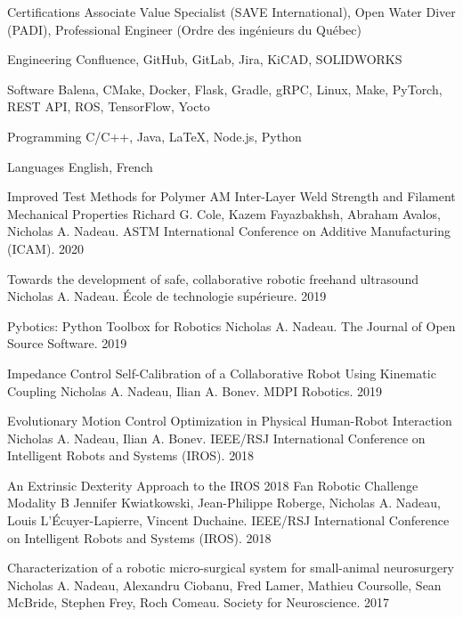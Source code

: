 \documentclass[11pt, letterpaper]{awesome-cv}
\begin{document}
\newpage

\begin{cvskills}

    \cvskill
    {Certifications}
    {
        Associate Value Specialist (SAVE International),
        Open Water Diver (PADI),
        Professional Engineer (Ordre des ingénieurs du Québec)
    }

    \cvskill
    {Engineering}
    {
        Confluence,
        GitHub,
        GitLab,
        Jira,
        KiCAD,
        SOLIDWORKS
    }

    \cvskill
    {Software}
    {
        Balena,
        CMake,
        Docker,
        Flask,
        Gradle,
        gRPC,
        Linux,
        Make,
        PyTorch,
        REST API,
        ROS,
        TensorFlow,
        Yocto
    }

    \cvskill
    {Programming}
    {
        C/C++,
        Java,
        LaTeX,
        Node.js,
        Python
    }

    \cvskill
    {Languages}
    {
        English,
        French
    }

\end{cvskills}

\begin{cvhonors}

    \cvhonor
    {Improved Test Methods for Polymer AM Inter-Layer Weld Strength and Filament Mechanical Properties}
    {Richard G. Cole, Kazem Fayazbakhsh, Abraham Avalos, Nicholas A. Nadeau. ASTM International Conference on Additive Manufacturing (ICAM).}
    {}
    {2020}

    \cvhonor
    {Towards the development of safe, collaborative robotic freehand ultrasound}
    {Nicholas A. Nadeau. École de technologie supérieure.}
    {}
    {2019}

    \cvhonor
    {Pybotics: Python Toolbox for Robotics}
    {Nicholas A. Nadeau. The Journal of Open Source Software.}
    {}
    {2019}

    \cvhonor
    {Impedance Control Self-Calibration of a Collaborative Robot Using Kinematic Coupling}
    {Nicholas A. Nadeau, Ilian A. Bonev. MDPI Robotics.}
    {}
    {2019}

    \cvhonor
    {Evolutionary Motion Control Optimization in Physical Human-Robot Interaction}
    {Nicholas A. Nadeau, Ilian A. Bonev. IEEE/RSJ International Conference on Intelligent Robots and Systems (IROS).}
    {}
    {2018}

    \cvhonor
    {An Extrinsic Dexterity Approach to the IROS 2018 Fan Robotic Challenge Modality B}
    {Jennifer Kwiatkowski, Jean-Philippe Roberge, Nicholas A. Nadeau, Louis L'Écuyer-Lapierre, Vincent Duchaine. IEEE/RSJ International Conference on Intelligent Robots and Systems (IROS).}
    {}
    {2018}

    \cvhonor
    {Characterization of a robotic micro-surgical system for small-animal neurosurgery}
    {Nicholas A. Nadeau, Alexandru Ciobanu, Fred Lamer, Mathieu Coursolle, Sean McBride, Stephen Frey, Roch Comeau. Society for Neuroscience.}
    {}
    {2017}

\end{cvhonors}
\end{document}
